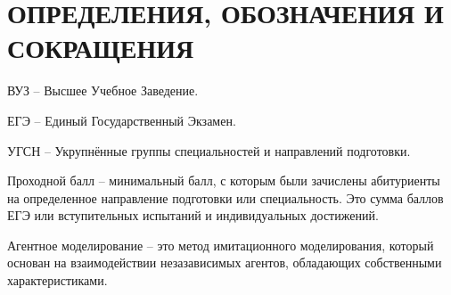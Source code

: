 \section*{ОПРЕДЕЛЕНИЯ, ОБОЗНАЧЕНИЯ И СОКРАЩЕНИЯ}

ВУЗ – Высшее Учебное Заведение.

ЕГЭ – Единый Государственный Экзамен.

УГСН – Укрупнённые группы специальностей и направлений подготовки.

Проходной балл – минимальный балл, с которым были зачислены абитуриенты на определенное направление подготовки или специальность. Это сумма баллов ЕГЭ или вступительных испытаний и индивидуальных достижений.

Агентное моделирование – это метод имитационного моделирования, который основан на взаимодействии незазависимых агентов, 
обладающих собственными характеристиками.

\pagebreak